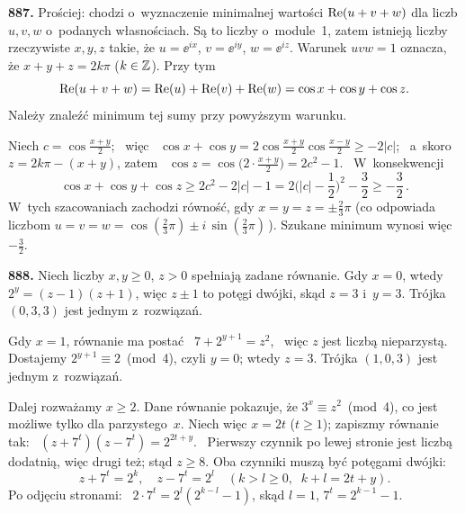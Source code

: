 {


\smallskip

{\bf887.}
Prościej: chodzi o~wyznaczenie minimalnej wartości
${{\rm{Re}}(u+v+w)}$ dla liczb $u,v,w$ o~podanych własnościach. Są to liczby o~module~1, zatem istnieją liczby rzeczywiste $x,y,z$ takie, że
${u=\ee^{ix}}$,
${v=\ee^{iy}}$,
${w=\ee^{iz}}$.
Warunek ${uvw=1}$ oznacza, że ${x+y+z=2k\pi}$ (${k\in{\mathbb{Z}}}$). Przy tym
$$
{\rm{Re}}(u+v+w)={\rm{Re}}(u)+{\rm{Re}}(v)+{\rm{Re}}(w)=\cos{x}+\cos{y}+\cos{z}.
$$
Należy znaleźć minimum tej sumy przy powyższym warunku.

Niech ${c=\cos\frac{x+y}2}$; \ więc \ ${\cos{x}+\cos{y}=2\cos\frac{x+y}2\cos\frac{x-y}2\ge-2|c|}$; \ a~skoro ${z=2k\pi-(x+y)}$, zatem \
${\cos{z}=\cos\bigl(2\cdot\frac{x+y}2\bigr)=2c^2-1}$. \ W~konsekwencji
$$
\textstyle
\cos{x}+\cos{y}+\cos{z}\ge2c^2-2|c|-1=2\bigl(|c|-\frac12\bigr)^2-\frac32\ge-\frac32\,.
$$
W~tych szacowaniach zachodzi równość, gdy ${x=y=z=\pm\frac23\pi}$ (co odpowiada liczbom ${u=v=w=\cos(\frac23\pi)\pm{i\,\sin(\frac23\pi)}}\,$). Szukane minimum wynosi więc~$-\frac32$.


\medskip
{\bf888.}
Niech liczby ${x,y\ge0}$, ${z>0}$ spełniają zadane równanie. Gdy ${x=0}$, wtedy ${2^y=(z-1)(z+1)}$, więc ${z\pm1}$ to potęgi dwójki, skąd ${z=3}$ i~${y=3}$. Trójka $(0,3,3)$ jest jednym z~rozwiązań.

Gdy ${x=1}$, równanie ma postać \ ${7+2^{y+1}=z^2}$, \ więc $z$ jest liczbą nieparzystą. Dostajemy ${2^{y+1}\equiv2}$~(mod~4), czyli ${y=0}$; wtedy ${z=3}$. Trójka $(1,0,3)$ jest jednym z~rozwiązań.

Dalej rozważamy ${x\ge2}$. Dane równanie pokazuje, że ${3^x\equiv{z^2}}$~(mod~4), co jest możliwe tylko dla parzystego~$x$. Niech więc ${x=2t}$ (${t\ge1}$); zapiszmy równanie tak: \ ${(z+7^t)(z-7^t)=2^{2t+y}}$. \ Pierwszy czynnik po lewej stronie jest liczbą dodatnią, więc drugi też; stąd ${z\ge8}$. Oba czynniki muszą być potęgami dwójki:
$$
z+7^t=2^k,\quad z-7^t=2^l\quad (k>l\ge0,\;\;k+l=2t+y).
$$
Po odjęciu stronami: \ ${2\cdot7^t=2^l(2^{k-l}-1)}$, skąd ${l=1}$, ${7^t=2^{k-1}-1}$.

}
